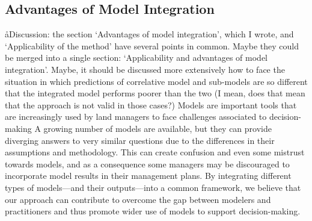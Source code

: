 
\subsection*{Advantages of Model Integration}
\aa{Discussion: the section ‘Advantages of model integration’, which I wrote, and ‘Applicability of the method’ have several points in common. Maybe they could be merged into a single section: ‘Applicability and advantages of model integration’. Maybe, it should be discussed more extensively how to face the situation in which predictions of correlative model and sub-models are so different that the integrated model performs poorer than the two (I mean, does that mean that the approach is not valid in those cases?)}
Models are important tools that are increasingly used by land managers to face challenges associated to decision-making \citep{Guisan2013}
A growing number of models are available, but they can provide diverging answers to very similar questions due to the differences in their assumptions and methodology. 
This can create confusion and even some mistrust towards models, and as a consequence some managers may be discouraged to incorporate model results in their management plans. 
By integrating different types of models---and their outputs---into a common framework, we believe that our approach can contribute to overcome the gap between modelers and practitioners and thus promote wider use of models to support decision-making.

